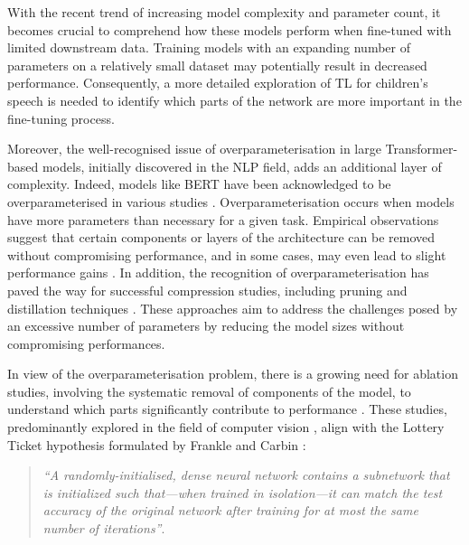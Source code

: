 With the recent trend of increasing model complexity and parameter count, it becomes crucial to comprehend how these models perform when fine-tuned with limited downstream data. Training models with an expanding number of parameters on a relatively small dataset may potentially result in decreased performance. Consequently, a more detailed exploration of \ac{TL} for children's speech is needed to identify which parts of the network are more important in the fine-tuning process.

Moreover, the well-recognised issue of overparameterisation in large Transformer-based models, initially discovered in the \ac{NLP} field, adds an additional layer of complexity. Indeed, models like BERT \cite{Bert} have been acknowledged to be overparameterised in various studies \cite{kovaleva-etal-2019-revealing,michel2019sixteen}. Overparameterisation occurs when models have more parameters than necessary for a given task. Empirical observations suggest that certain components or layers of the architecture can be removed without compromising performance, and in some cases, may even lead to slight performance gains \cite{kovaleva-etal-2019-revealing,michel2019sixteen,ye2023partial}. In addition, the recognition of overparameterisation has paved the way for successful compression studies, including pruning and distillation techniques \cite{mccarley2019structured,sanh2019distilbert}. These approaches aim to address the challenges posed by an excessive number of parameters by reducing the model sizes without compromising performances. 

In view of the overparameterisation problem, there is a growing need for ablation studies, involving the systematic removal of components of the model, to understand which parts significantly contribute to performance \cite{shen2021partial,wang2021fine}. These studies, predominantly explored in the field of computer vision \cite{ye2023partial}, align with the Lottery Ticket hypothesis formulated by Frankle and Carbin \cite{frankle2018lottery}:

\begin{quote}
    \textit{``A randomly-initialised, dense neural network contains a subnetwork that is initialized such that—when trained in isolation—it can match the test accuracy of the original network after training for at most the same number of iterations''}.
\end{quote}
 
